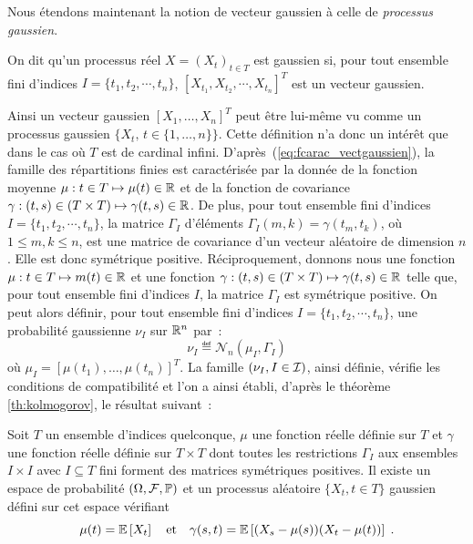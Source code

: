 Nous \'etendons maintenant la notion de vecteur gaussien \`a celle de
\emph{processus gaussien}.
\begin{definition}
 On dit qu'un processus r\'eel $X= (X_t)_{t \in T}$ est gaussien si,
pour tout ensemble fini d'indices $I=\{t_1, t_2, \cdots,t_n\}$,
$[X_{t_1}, X_{t_2}, \cdots, X_{t_n}]^T$ est un vecteur gaussien.
\end{definition}
Ainsi un vecteur gaussien $[X_1,\dots,X_n]^T$ peut \^{e}tre lui-m\^{e}me vu comme un
processus gaussien $\{X_t, \,t\in \{1,\dots,n\}\}$. Cette d\'efinition
n'a donc un int\'er\^{e}t que dans le cas o\`u $T$ est de cardinal infini.
D'apr\`es~(\ref{eq:fcarac_vectgaussien}), la famille des r\'epartitions finies est
 caract\'eris\'ee par la donn\'ee de la fonction moyenne $\mu:t\in T \mapsto
\mu(t)\in \mathbb{R}$ et de la fonction de covariance $\gamma:(t,s)\in(T\times T)
\mapsto \gamma(t,s)\in \mathbb{R}$. De plus, pour tout ensemble fini
d'indices $I=\{t_1, t_2, \cdots,t_n\}$, la matrice $\Gamma_I$ d'\'el\'ements
$\Gamma_I(m,k) = \gamma(t_m, t_k)$, o\`u $1 \leq m,k \leq n$, est une matrice
de covariance d'un vecteur al\'eatoire de dimension $n$. Elle est donc
sym\'etrique positive.
R\'eciproquement, donnons nous une fonction $\mu:t\in T \mapsto m(t)\in \mathbb{R}$ et
une fonction $\gamma:(t,s)\in(T\times T) \mapsto \gamma(t,s)\in \mathbb{R}$ telle
que, pour tout ensemble fini d'indices $I$, la matrice $\Gamma_I$ est
sym\'etrique positive.  On peut alors d\'efinir, pour tout ensemble fini d'indices
$I=\{t_1, t_2, \cdots,t_n\}$, une probabilit\'e gaussienne $\nu_I$ sur $\mathbb{R}^n$
par~:
\begin{equation}
\label{eq:rel11} \nu_I \eqdef \mathcal{N}_n( \mu_I, \Gamma_I)
\end{equation}
o\`u $\mu_I= [\mu(t_1), \dots, \mu(t_n)]^T$. La famille $(\nu_I,I \in \mathcal{I})$,
ainsi d\'efinie, v\'erifie les conditions de compatibilit\'e et l'on a ainsi \'etabli,
d'apr\`es le th\'eor\`eme \ref{th:kolmogorov}, le r\'esultat suivant~:
\begin{theorem}
  Soit $T$ un ensemble d'indices quelconque, $\mu$ une fonction r\'eelle d\'efinie
  sur $T$ et $\gamma$ une fonction r\'eelle d\'efinie sur $T\times T$ dont toutes
  les restrictions $\Gamma_I$ aux ensembles $I\times I$ avec $I\subseteq T$
  fini forment des matrices sym\'etriques positives. Il existe un espace de
  probabilit\'e $(\Omega,\mathcal{F},\mathbb{P})$ et un processus al\'eatoire $\{X_t, t
  \in T\}$ gaussien d\'efini sur cet espace v\'erifiant
  \[
  \mu(t)= {\mathbb E}\left[  X_t  \right] \quad \mbox{et}\quad \gamma(s,t)= {\mathbb E}\left[  (X_s - \mu(s)) (X_t - \mu(t)) \right]\;.
  \]
\end{theorem}
